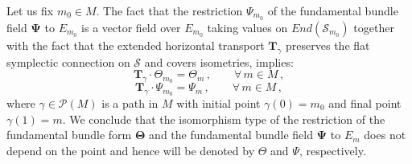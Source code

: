 \documentclass[10pt, cmp, numbook, final, a4paper]{svjour}
\def\bTheta{\mathbf{\Theta}}
\def\bPsi{\mathbf{\Psi}}
\def\cP{\mathcal{P}}
\def\cS{\mathcal{S}}
\def\mT{\mathbf{T}}
\def\bcS{\boldsymbol{\mathcal{S}}}
\begin{document}
Let us fix $m_{0}\in M$. The fact that the restriction $\Psi_{m_{0}}$
of the fundamental bundle field $\bPsi$ to $E_{m_{0}}$ is a vector
field over $E_{m_{0}}$ taking values on $End(\cS_{m_{0}})$ together
with the fact that the extended horizontal transport $\mT_{\gamma}$
preserves the flat symplectic connection on $\bcS$ and covers
isometries, implies:
\begin{equation}
\label{eq:isoTheta}
\mT_{\gamma} \cdot \Theta_{m_{0}} = \Theta_{m}\, , \qquad \forall\, m\in M\, ,
\end{equation}
\begin{equation}
\label{eq:isoPsi}
\mT_{\gamma} \cdot\Psi_{m_{0}} = \Psi_{m}\, , \qquad \forall\, m\in M\, ,
\end{equation}
where $\gamma\in\cP(M)$ is a path in $M$ with initial point $\gamma(0)
= m_{0}$ and final point $\gamma(1) = m$. We conclude that the
isomorphism type of the restriction of the fundamental bundle form
$\bTheta$ and the fundamental bundle field $\bPsi$ to $E_{m}$ does not
depend on the point and hence will be denoted by $\Theta$ and $\Psi$,
respectively.
\end{document}
